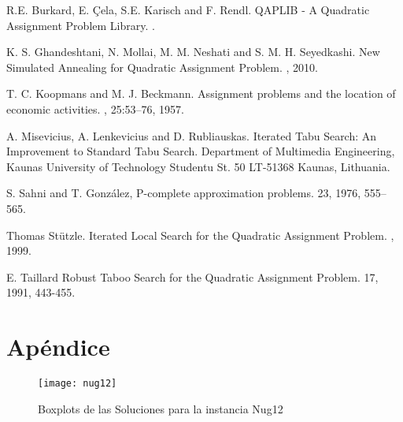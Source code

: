 \documentclass{ci5652}
\begin{document}
\begin{thebibliography}{99}

R.E. Burkard, E. Çela, S.E. Karisch and F. Rendl.
\newblock QAPLIB - A Quadratic Assignment Problem Library.
.

K. S. Ghandeshtani, N. Mollai, M. M. Neshati and S. M. H. Seyedkashi.
\newblock New Simulated Annealing for Quadratic Assignment Problem.
, 2010.


T. C. Koopmans and M. J. Beckmann. 
\newblock Assignment problems and the location of economic activities.
, 25:53–76, 1957.

A. Misevicius, A. Lenkevicius and D. Rubliauskas.
\newblock Iterated Tabu Search: An Improvement to Standard Tabu Search.
\newblock Department of Multimedia Engineering, Kaunas University of Technology Studentu St. 50 LT-51368 Kaunas, Lithuania.

S. Sahni and T. González, 
\newblock P-complete approximation problems.
 23, 1976, 555–565.

Thomas Stützle.
\newblock Iterated Local Search for the Quadratic Assignment Problem.
, 1999.

E. Taillard
\newblock Robust Taboo Search for the Quadratic Assignment Problem.
 17, 1991, 443-455.


\end{thebibliography}


\newpage
\section*{Apéndice}

\begin{figure}[ht]
	\caption{Boxplots de las Soluciones para la instancia Nug12}
	\texttt{[image: nug12]}
    \centering
    \label{fig:boxplot_nug12}
\end{figure}
\end{document}
